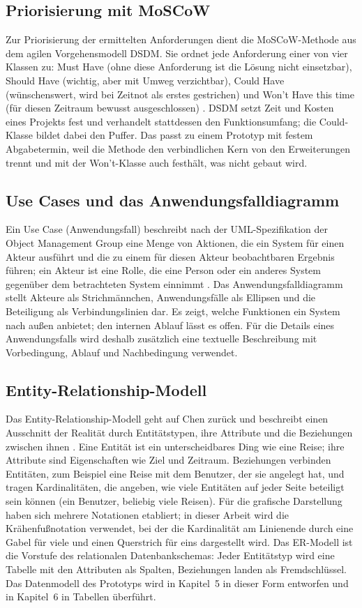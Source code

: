 \documentclass[12pt,a4paper]{scrreprt}
\begin{document}
\subsection{Priorisierung mit MoSCoW}
Zur Priorisierung der ermittelten Anforderungen dient die MoSCoW-Methode aus dem agilen Vorgehensmodell DSDM. Sie ordnet jede Anforderung einer von vier Klassen zu: Must Have (ohne diese Anforderung ist die Lösung nicht einsetzbar), Should Have (wichtig, aber mit Umweg verzichtbar), Could Have (wünschenswert, wird bei Zeitnot als erstes gestrichen) und Won't Have this time (für diesen Zeitraum bewusst ausgeschlossen) \cite{agilebusiness}. DSDM setzt Zeit und Kosten eines Projekts fest und verhandelt stattdessen den Funktionsumfang; die Could-Klasse bildet dabei den Puffer. Das passt zu einem Prototyp mit festem Abgabetermin, weil die Methode den verbindlichen Kern von den Erweiterungen trennt und mit der Won't-Klasse auch festhält, was nicht gebaut wird.

\subsection{Use Cases und das Anwendungsfalldiagramm}
Ein Use Case (Anwendungsfall) beschreibt nach der UML-Spezifikation der Object Management Group eine Menge von Aktionen, die ein System für einen Akteur ausführt und die zu einem für diesen Akteur beobachtbaren Ergebnis führen; ein Akteur ist eine Rolle, die eine Person oder ein anderes System gegenüber dem betrachteten System einnimmt \cite{omguml}. Das Anwendungsfalldiagramm stellt Akteure als Strichmännchen, Anwendungsfälle als Ellipsen und die Beteiligung als Verbindungslinien dar. Es zeigt, welche Funktionen ein System nach außen anbietet; den internen Ablauf lässt es offen. Für die Details eines Anwendungsfalls wird deshalb zusätzlich eine textuelle Beschreibung mit Vorbedingung, Ablauf und Nachbedingung verwendet.

\subsection{Entity-Relationship-Modell}
Das Entity-Relationship-Modell geht auf Chen zurück und beschreibt einen Ausschnitt der Realität durch Entitätstypen, ihre Attribute und die Beziehungen zwischen ihnen \cite{chen1976}. Eine Entität ist ein unterscheidbares Ding wie eine Reise; ihre Attribute sind Eigenschaften wie Ziel und Zeitraum. Beziehungen verbinden Entitäten, zum Beispiel eine Reise mit dem Benutzer, der sie angelegt hat, und tragen Kardinalitäten, die angeben, wie viele Entitäten auf jeder Seite beteiligt sein können (ein Benutzer, beliebig viele Reisen). Für die grafische Darstellung haben sich mehrere Notationen etabliert; in dieser Arbeit wird die Krähenfußnotation verwendet, bei der die Kardinalität am Linienende durch eine Gabel für \glqq viele\grqq{} und einen Querstrich für \glqq eins\grqq{} dargestellt wird. Das ER-Modell ist die Vorstufe des relationalen Datenbankschemas: Jeder Entitätstyp wird eine Tabelle mit den Attributen als Spalten, Beziehungen landen als Fremdschlüssel. Das Datenmodell des Prototyps wird in Kapitel~5 in dieser Form entworfen und in Kapitel~6 in Tabellen überführt.
\end{document}

